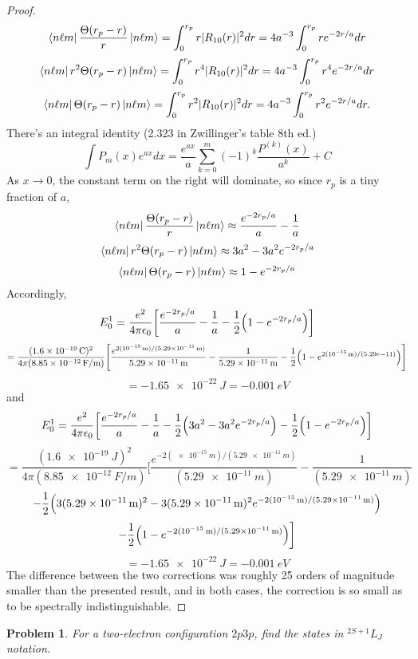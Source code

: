 \documentclass{article}
\newtheorem{plm}{Problem}
\begin{document}
\begin{proof}
  \[
    \bra{n\ell m} \frac{\Theta(r_{p} - r)}{r} \ket{n\ell m} = \int_{0}^{r_{p}}r|R_{10}(r)|^{2}dr = 4a^{-3}\int_{0}^{r_{p}}re^{-2r/a}dr
  \]
  \[
    \bra{n\ell m} r^{2}\Theta(r_{p} - r) \ket{n\ell m} = \int_{0}^{r_{p}}r^{4}|R_{10}(r)|^{2}dr = 4a^{-3}\int_{0}^{r_{p}}r^{4}e^{-2r/a}dr
  \]
  \[
    \bra{n\ell m}\Theta(r_{p} - r) \ket{n\ell m} = \int_{0}^{r_{p}}r^{2}|R_{10}(r)|^{2}dr = 4a^{-3}\int_{0}^{r_{p}}r^{2}e^{-2r/a}dr.
  \]
  There's an integral identity (2.323 in Zwillinger's table 8th ed.)
  \[
    \int P_{m}(x)e^{ax}dx = \frac{{e^{ax}}}a\sum_{k = 0}^{m}(-1)^{k}\frac{P^{(k)}(x)}{a^{k}} + C
  \]
  As $x \to 0$, the constant term on the right will dominate, so since $r_{p}$ is a tiny fraction of $a$,
  \[
    \bra{n\ell m} \frac{\Theta(r_{p} - r)}{r} \ket{n\ell m} \approx \frac{e^{-2r_{p}/a}}{a} - \frac{1}{a}
  \]
  \[
    \bra{n\ell m} r^{2}\Theta(r_{p} - r) \ket{n\ell m} \approx 3a^{2} - 3a^{2}e^{-2r_{p}/a}
  \]
  \[
    \bra{n\ell m}\Theta(r_{p} - r) \ket{n\ell m} \approx 1 - e^{-2r_{p}/a}
  \]
  Accordingly,
  \[
    E_{0}^{1} = \frac{e^{2}}{4\pi\epsilon_{0}}\qty[\frac{e^{-2r_{p}/a}}{a} - \frac{1}{a} - \frac{1}{2}\qty(1 - e^{-2r_{p}/a})]
  \]
  \[
    = \frac{(\SI{1.6e-19}{C})^{2}}{4\pi(\SI{8.85e-12}{F/m})} \qty[\frac{e^{2(\SI{e-15}{m})/(\SI{5.29e-11}{m})}}{\SI{5.29e-11}{m}}
    - \frac{1}{\SI{5.29e-11}{m}} - \frac{1}{2}\qty(1 - e^{2(\SI{e-15}{m})/(5.29e-11)})]
  \]
  \[
    = \SI{-1.65e-22}{J} = \SI{-0.001}{eV}
  \]
  and
  \[
    E_{0}^{1} = \frac{e^{2}}{4\pi\epsilon_{0}}\qty[\frac{e^{-2r_{p}/a}}{a} - \frac{1}{a} - \frac{1}{2}\qty(3a^{2}
    - 3a^{2}e^{-2r_{p}/a}) - \frac{1}{2}\qty(1 - e^{-2r_{p}/a})]
  \]
  \[
    = \frac{(\SI{1.6e-19}{J})^{2}}{4\pi (\SI{8.85e-12}{F/m})}\bigg[\frac{e^{-2(\SI{e-15}{m})/(\SI{5.29e-11}{m})}}{(\SI{5.29e-11}{m})}
    - \frac{1}{(\SI{5.29e-11}{m})}\]
  \[
    - \frac{1}{2}\qty(3(\SI{5.29e-11}{m})^{2} - 3(\SI{5.29e-11}{m})^{2}e^{-2(\SI{e-15}{m})/(\SI{5.29e-11}{m})})
  \]
  \[
    - \frac{1}{2}\qty(1 - e^{-2(\SI{e-15}{m})/(\SI{5.29e-11}{m})})\bigg]
  \]
  \[
    = \SI{-1.65e-22}{J} = \SI{-0.001}{eV}
  \]
  The difference between the two corrections was roughly 25 orders of magnitude smaller than the presented result, and in both cases,
  the correction is so small as to be spectrally indistinguishable.
\end{proof}

\begin{plm}
  For a two-electron configuration $2p3p$, find the states in $^{2S+1}L_{J}$ notation.
\end{plm}
\end{document}
